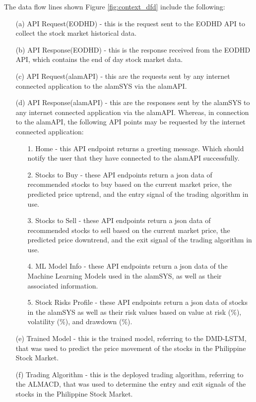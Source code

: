 The data flow lines shown Figure \ref{fig:context_dfd} include the following:
\begin{itemize}
    \item[(a)] API Request(EODHD) - this is the request sent to the EODHD API to collect the 
    stock market historical data.
    \item[(b)] API Response(EODHD) - this is the response received from the 
    EODHD API, which contains the end of day stock market data.
    \item[(c)] API Request(alamAPI) - this are the requests sent by any 
    internet connected application to the alamSYS via the alamAPI.
    \item[(d)] API Response(alamAPI) - this are the responses sent by the alamSYS to 
    any internet connected application via the alamAPI. Whereas, in connection to 
    the alamAPI, the following API points may be requested by the internet connected application:
    \begin{itemize}
        \item[1.] Home - this API endpoint returns a greeting message. Which should notify the 
        user that they have connected to the alamAPI successfully.
        \item[2.] Stocks to Buy - these API endpoints return a json data of recommended stocks to 
        buy based on the current market price, the predicted price uptrend, and the entry signal of the
        trading algorithm in use.
        \item[3.] Stocks to Sell - these API endpoints return a json data of recommended stocks to 
        sell based on the current market price, the predicted price downtrend, and the exit signal of the
        trading algorithm in use.
        \item[4.] ML Model Info - these API endpoints return a json data of the Machine Learning Models 
        used in the alamSYS, as well as their associated information.
        \item[5.] Stock Risks Profile - these API endpoints return a json data of stocks in the 
        alamSYS as well as their risk values based on value at risk (\%), volatility (\%), and drawdown (\%).
    \end{itemize}
    \item[(e)] Trained Model - this is the trained model, referring to the DMD-LSTM, that was used to predict the 
    price movement of the stocks in the Philippine Stock Market.
    \item[(f)] Trading Algorithm - this is the deployed trading algorithm, referring to the ALMACD,
    that was used to determine the entry and exit signals of the stocks in the Philippine Stock Market.
\end{itemize}


